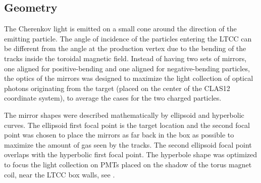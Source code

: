 \subsection{Geometry}

The Cherenkov light is emitted on a small cone around the direction of the emitting particle. The angle of
incidence of the particles entering the LTCC can be different from the angle at the production vertex due to the bending of the tracks
inside the toroidal magnetic field. Instead of having two sets of mirrors, one aligned for positive-bending and one aligned for negative-bending particles,
the optics of the mirrors was designed to maximize the light collection of optical photons originating from the target (placed on the center of the CLAS12 coordinate system),
to average the cases for the two charged particles.

The mirror shapes were described mathematically by ellipsoid and hyperbolic curves.
The ellipsoid first focal point is the target location and the second focal point was chosen
to place the mirrors as far back in the box as possible to maximize the amount of gas seen by the tracks.
The second ellipsoid focal point overlaps with the hyperbolic first focal point. The hyperbole shape was optimized to focus the light
collection on PMTs placed on the shadow of the torus magnet coil, near the LTCC box walls, see .


